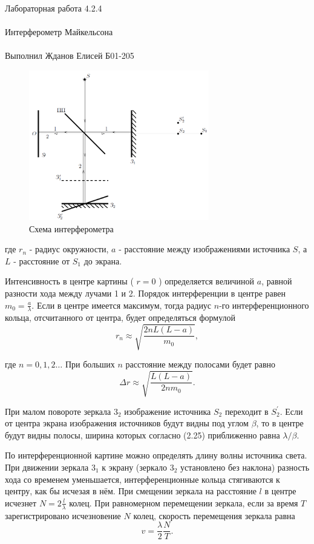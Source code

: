 \documentclass{astroedu-lab}
\begin{document}
\begin{problem}{\huge Лабораторная работа 4.2.4\\\\Интерферометр Майкельсона\\\\Выполнил Жданов Елисей Б01-205}
\begin{figure}[!h]
	\centering
	\includegraphics[width=0.7\textwidth]{теоруст.png}
	\caption{Схема интерферометра}
	\label{fig:boiler}
\end{figure}

где $r_n$ - радиус окружности, $a$ - расстояние между изображениями источника $S$, а $L$ - расстояние от $S_1$ до экрана.

Интенсивность в центре картины ( $r=0$ ) определяется величиной $a$, равной разности хода между лучами 1 и 2. Порядок интерференции в центре равен $m_0=\frac{a}{\lambda}$. Если в центре имеется максимум, тогда радиус $n$-го интерференционного кольца, отсчитанного от центра, будет определяться формулой
$$
r_n \approx \sqrt{\frac{2 n L(L-a)}{m_0}},
$$

где $n=0,1,2 \ldots$ При больших $n$ расстояние между полосами будет равно
$$
\Delta r \approx \sqrt{\frac{L(L-a)}{2 n m_0}} .
$$






При малом повороте зеркала $3_2$ изображение источника $S_2$ переходит в $S_2^{\prime}$. Если от центра экрана изображения источников будут видны под углом $\beta$, то в центре будут видны полосы, ширина которых согласно (2.25) приближенно равна $\lambda / \beta$.

По интерференционной картине можно определять длину волны источника света. При движении зеркала $3_1$ к экрану (зеркало $3_2$ установлено без наклона) разность хода со временем уменьшается, интерференционные кольца стягиваются к центру, как бы исчезая в нём. При смещении зеркала на расстояние $l$ в центре исчезнет $N=2 \frac{l}{\lambda}$ колец. При равномерном перемещении зеркала, если за время $T$ зарегистрировано исчезновение $N$ колец, скорость перемещения зеркала равна
$$
v=\frac{\lambda}{2} \frac{N}{T} .
$$


\end{problem}
\end{document}
